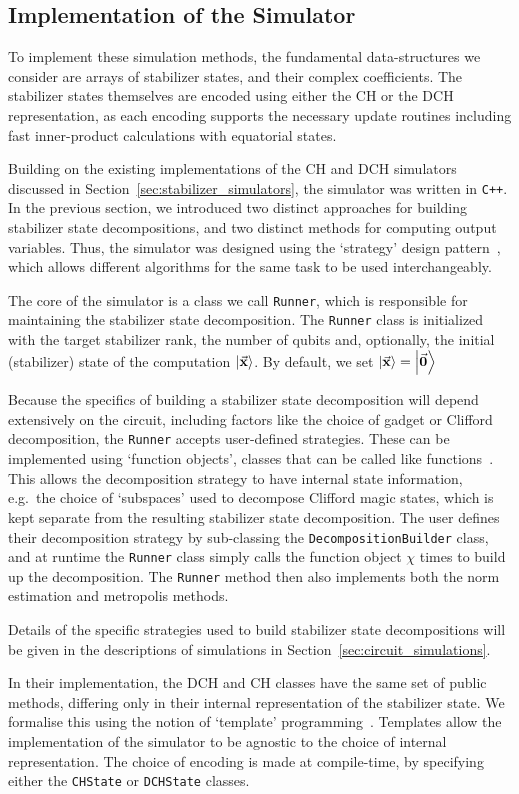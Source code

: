 \subsection{Implementation of the Simulator}\label{sec:implementing_simulator}
To implement these simulation methods, the fundamental data-structures we consider are arrays of stabilizer states, and their complex coefficients. The stabilizer states themselves are encoded using either the CH or the DCH representation, as each encoding supports the necessary update routines including fast inner-product calculations with equatorial states.\par
Building on the existing implementations of the CH and DCH simulators discussed in Section~\ref{sec:stabilizer_simulators}, the simulator was written in \texttt{C++}. In the previous section, we introduced two distinct approaches for building stabilizer state decompositions, and two distinct methods for computing output variables. Thus, the simulator was designed using the `strategy' design pattern~\cite{GoF}, which allows different algorithms for the same task to be used interchangeably.\par
The core of the simulator is a class we call \texttt{Runner}, which is responsible for maintaining the stabilizer state decomposition. The \texttt{Runner} class is initialized with the target stabilizer rank, the number of qubits and, optionally, the initial (stabilizer) state of the computation $\ket{\va{x}}$. By default, we set $\ket{\va{x}}=\ket{\va{0}}$\par
Because the specifics of building a stabilizer state decomposition will depend extensively on the circuit, including factors like the choice of gadget or Clifford decomposition, the \texttt{Runner} accepts user-defined strategies. These can be implemented using `function objects', classes that can be called like functions~\cite{CPPRefFunctionObject}. This allows the decomposition strategy to have internal state information, e.g.\ the choice of `subspaces' used to decompose Clifford magic states, which is kept separate from the resulting stabilizer state decomposition. The user defines their decomposition strategy by sub-classing the \texttt{DecompositionBuilder} class, and at runtime the \texttt{Runner} class simply calls the function object $\chi$ times to build up the decomposition. The \texttt{Runner} method then also implements both the norm estimation and metropolis methods.\par
Details of the specific strategies used to build stabilizer state decompositions will be given in the descriptions of simulations in Section~\ref{sec:circuit_simulations}.\par
In their implementation, the DCH and CH classes have the same set of public methods, differing only in their internal representation of the stabilizer state. We formalise this using the notion of `template' programming~\cite{GoF,CPPRefTemplates}. Templates allow the implementation of the simulator to be agnostic to the choice of internal representation. The choice of encoding is made at compile-time, by specifying either the \texttt{CHState} or \texttt{DCHState} classes.\par
